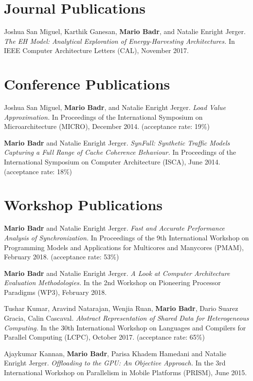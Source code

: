 \section{\sc Journal Publications}

\onecol
{
  Joshua San Miguel, Karthik Ganesan, \textbf{Mario Badr}, and Natalie Enright Jerger.
  \textit{The EH Model: Analytical Exploration of Energy-Harvesting Architectures.}
  In IEEE Computer Architecture Letters (CAL), November 2017.
}

\section{\sc Conference Publications}

\onecol
{
  Joshua San Miguel, \textbf{Mario Badr}, and Natalie Enright Jerger.
  \textit{Load Value Approximation.}
  In Proceedings of the International Symposium on Microarchitecture (MICRO), December 2014.
  (acceptance rate: 19\%)
}

\onecol
{
  \textbf{Mario Badr} and Natalie Enright Jerger.
  \textit{SynFull: Synthetic Traffic Models Capturing a Full Range of Cache Coherence Behaviour.}
  In Proceedings of the International Symposium on Computer Architecture (ISCA), June 2014.
  (acceptance rate: 18\%)
}

\section{\sc Workshop Publications}

\onecol
{
  \textbf{Mario Badr} and Natalie Enright Jerger.
  \textit{Fast and Accurate Performance Analysis of Synchronization.}
  In Proceedings of the 9th International Workshop on Programming Models and Applications for Multicores and Manycores (PMAM), February 2018.
  (acceptance rate: 53\%)
}

\onecol
{
  \textbf{Mario Badr} and Natalie Enright Jerger.
  \textit{A Look at Computer Architecture Evaluation Methodologies.}
  In the 2nd Workshop on Pioneering Processor Paradigms (WP3), February 2018.
}

\onecol
{
  Tushar Kumar, Aravind Natarajan, Wenjia Ruan, \textbf{Mario Badr}, Dario Suarez Gracia, Calin Cascaval.
  \textit{Abstract Representation of Shared Data for Heterogeneous Computing.}
  In the 30th International Workshop on Languages and Compilers for Parallel Computing (LCPC), October 2017.
  (acceptance rate: 65\%)
}

\onecol
{
  Ajaykumar Kannan, \textbf{Mario Badr}, Parisa Khadem Hamedani and Natalie Enright Jerger.
  \textit{Offloading to the GPU: An Objective Approach.}
  In the 3rd International Workshop on Parallelism in Mobile Platforms (PRISM), June 2015.
}

